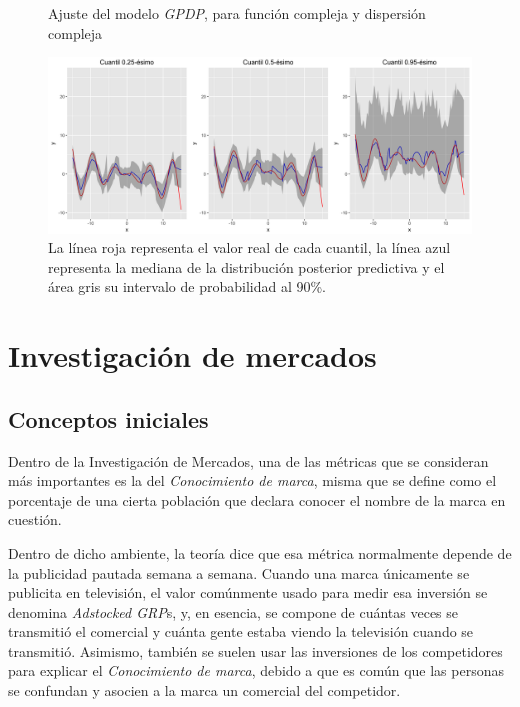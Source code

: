 \begin{figure}[H]
	\centering
	\caption{Ajuste del modelo \textit{GPDP}, para funci\'on compleja y dispersi\'on compleja}
	\includegraphics[width=\textwidth]{Figures/Simulation/complex_g_complex_error/fitted_models.png}
	\captionsetup{singlelinecheck=off,font=footnotesize}
    \caption*{La l\'inea roja representa el valor real de cada cuantil, la l\'inea azul representa la mediana de la distribuci\'on posterior predictiva y el \'area gris su intervalo de probabilidad al 90\%.}
	\label{fitted_cgce}
\end{figure}

\section{Investigaci\'on de mercados}

\subsection{Conceptos iniciales}

Dentro de la Investigaci\'on de Mercados, una de las m\'etricas que se consideran m\'as importantes es la del \textit{Conocimiento de marca}, misma que se define como el porcentaje de una cierta poblaci\'on que declara conocer el nombre de la marca en cuesti\'on.

Dentro de dicho ambiente, la teor\'ia dice que esa m\'etrica normalmente depende de la publicidad pautada semana a semana. Cuando una marca \'unicamente se publicita en televisi\'on, el valor com\'unmente usado para medir esa inversi\'on se denomina \textit{Adstocked GRP}s, y, en esencia, se compone de cu\'antas veces se transmiti\'o el comercial y cu\'anta gente estaba viendo la televisi\'on cuando se transmiti\'o. Asimismo, tambi\'en se suelen usar las inversiones de los competidores para explicar el \textit{Conocimiento de marca}, debido a que es com\'un que las personas se confundan y asocien a la marca un comercial del competidor.

